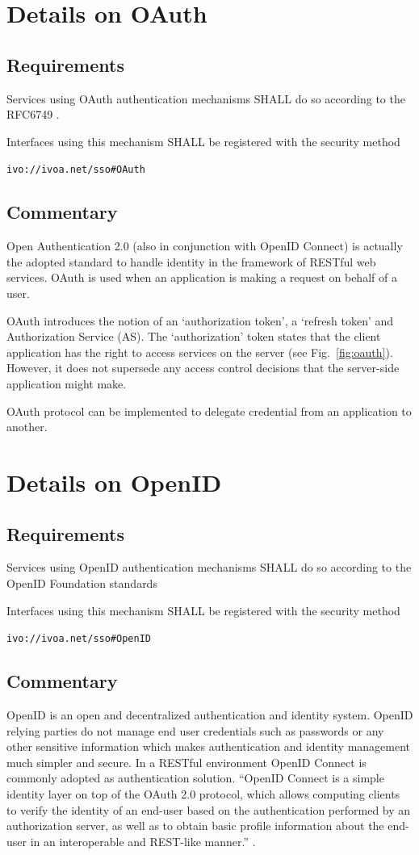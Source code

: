 \documentclass[11pt,a4paper]{ivoa}
\begin{document}
{{{\section{Details on OAuth}
\subsection{Requirements}
Services using OAuth authentication mechanisms SHALL do so according to the RFC6749 \citep{std:RFC6749}.

Interfaces using this mechanism SHALL  be registered with the security method

\texttt{ivo://ivoa.net/sso\#OAuth}


\subsection{Commentary}
Open Authentication 2.0 (also in conjunction with OpenID Connect) is actually the adopted standard
to handle identity in the framework of RESTful web services.
OAuth is used when an application is making a request on behalf of a user.

OAuth introduces the notion of an `authorization token', a `refresh token' and Authorization Service (AS).
The `authorization' token states that the client application has the right to access services on the server  (see Fig.~\ref{fig:oauth}).
However, it does not supersede any access control decisions that the server-side application might make.

OAuth protocol can be implemented  to delegate credential from an application to another.

\section{Details on OpenID}
\subsection{Requirements}
Services using OpenID authentication mechanisms SHALL do so according to the OpenID Foundation standards \citep{std:openid}

Interfaces using this mechanism SHALL  be registered with the security method

\texttt{ivo://ivoa.net/sso\#OpenID}


\subsection{Commentary}
OpenID is an open and decentralized authentication and identity system. OpenID relying parties do not manage end user credentials
such as passwords or any other sensitive information which makes authentication and identity management much simpler and secure.
In a RESTful environment OpenID Connect \citep{std:openidconnect} is commonly adopted as authentication solution. ``OpenID Connect  is a simple identity
layer on top of the OAuth 2.0 protocol, which allows computing clients to verify the identity of an end-user based on the authentication
 performed by an authorization server, as well as to obtain basic profile information about the end-user in an interoperable and REST-like manner.'' \citep{std:openid}.

}}}
\end{document}
